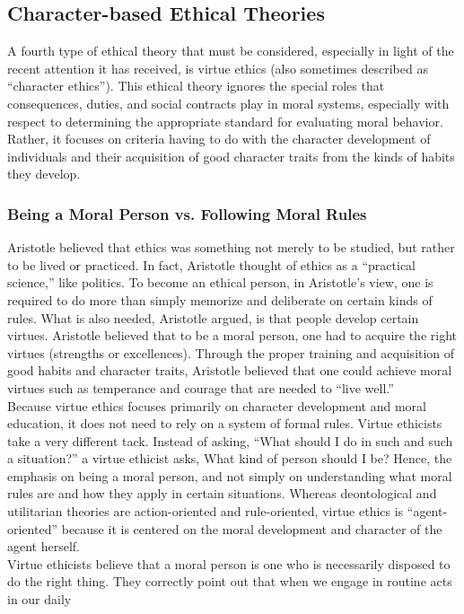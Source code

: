 \documentclass[12pt]{article}
\theoremstyle{definition}
\begin{document}
\subsection{Character-based Ethical Theories}
A fourth type of ethical theory that must be considered, especially in light of the recent
attention it has received, is virtue ethics (also sometimes described as “character ethics”).
This ethical theory ignores the special roles that consequences, duties, and social
contracts play in moral systems, especially with respect to determining the appropriate
standard for evaluating moral behavior. Rather, it focuses on criteria having to do with
the character development of individuals and their acquisition of good character traits
from the kinds of habits they develop.
\subsubsection{Being a Moral Person vs. Following Moral Rules}
Aristotle believed that ethics was something not merely to be studied, but rather to be
lived or practiced. In fact, Aristotle thought of ethics as a “practical science,” like politics.
To become an ethical person, in Aristotle’s view, one is required to do more than simply
memorize and deliberate on certain kinds of rules. What is also needed, Aristotle argued,
is that people develop certain virtues. Aristotle believed that to be a moral person, one had to acquire the right
virtues (strengths or excellences). Through the proper training and acquisition of good
habits and character traits, Aristotle believed that one could achieve moral virtues such as
temperance and courage that are needed to “live well.”\\
Because virtue ethics focuses primarily on character development and moral education,
it does not need to rely on a system of formal rules. Virtue ethicists take
a very different tack. Instead of asking, “What should I do in such and such a situation?” a
virtue ethicist asks, What kind of person should I be? Hence, the emphasis on being a
moral person, and not simply on understanding what moral rules are and how they apply in certain situations. Whereas deontological and utilitarian theories are action-oriented
and rule-oriented, virtue ethics is “agent-oriented” because it is centered on the moral
development and character of the agent herself.\\
Virtue ethicists believe that a moral person is one who is necessarily disposed to do
the right thing. They correctly point out that when we engage in routine acts in our daily
\end{document}
